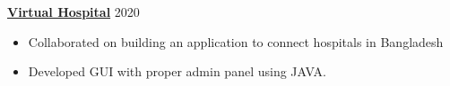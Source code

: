 \textbf{\href{https://github.com/tanjet/virtual-hospital}{Virtual Hospital}} \hfill 2020\par
\begin{itemize}
	\item Collaborated on building an application to connect hospitals in Bangladesh
	\item Developed GUI with proper admin panel using JAVA.
\end{itemize} \par